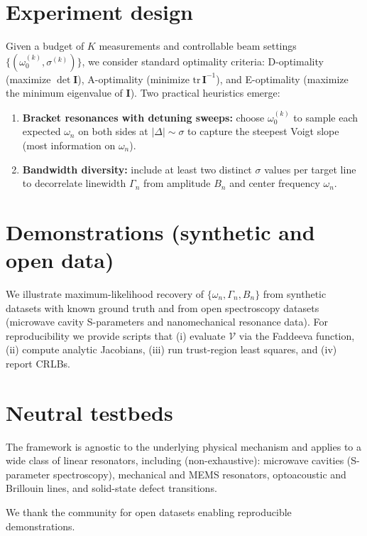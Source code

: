 \documentclass[aip,jap,preprint,amsmath,amssymb]{revtex4-2} %
\begin{document}
    \section{Experiment design}
        Given a budget of $K$ measurements and controllable beam settings $\{(\omega_0^{(k)},\sigma^{(k)})\}$,
        we consider standard optimality criteria: D-optimality (maximize $\det \mathbf{I}$),
        A-optimality (minimize $\mathrm{tr}\,\mathbf{I}^{-1}$), and E-optimality (maximize the minimum eigenvalue of $\mathbf{I}$).
        Two practical heuristics emerge:
        \begin{enumerate}
            \item \textbf{Bracket resonances with detuning sweeps:} choose $\omega_0^{(k)}$ to sample each expected $\omega_n$
            on both sides at $|\Delta|\sim\sigma$ to capture the steepest Voigt slope (most information on $\omega_n$).
            \item \textbf{Bandwidth diversity:} include at least two distinct $\sigma$ values per target line to decorrelate
            linewidth $\Gamma_n$ from amplitude $B_n$ and center frequency $\omega_n$.
        \end{enumerate}

    \section{Demonstrations (synthetic and open data)}
        We illustrate maximum-likelihood recovery of $\{\omega_n,\Gamma_n,B_n\}$ from synthetic datasets with known ground truth and
        from open spectroscopy datasets (microwave cavity S-parameters and nanomechanical resonance data).
        For reproducibility we provide scripts that (i) evaluate $\mathcal{V}$ via the Faddeeva function,
        (ii) compute analytic Jacobians, (iii) run trust-region least squares, and (iv) report CRLBs.

    \section{Neutral testbeds}
        The framework is agnostic to the underlying physical mechanism and applies to a wide class of linear resonators,
        including (non-exhaustive): microwave cavities (S-parameter spectroscopy), mechanical and MEMS resonators,
        optoacoustic and Brillouin lines, and solid-state defect transitions.


        \begin{acknowledgments}
            We thank the community for open datasets enabling reproducible demonstrations.
        \end{acknowledgments}
\end{document}
